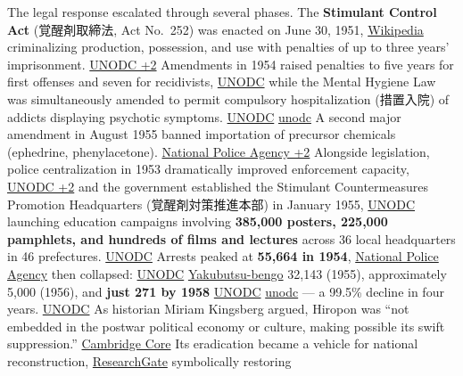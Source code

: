 The legal response escalated through several phases. The \textbf{Stimulant Control Act} (覚醒剤取締法, Act No.~252) was enacted on June 30, 1951, \href{https://ja.wikipedia.org/wiki/\%E3\%83\%A1\%E3\%82\%BF\%E3\%83\%B3\%E3\%83\%95\%E3\%82\%A7\%E3\%82\%BF\%E3\%83\%9F\%E3\%83\%B3}{Wikipedia} criminalizing production, possession, and use with penalties of up to three years' imprisonment. \href{https://www.unodc.org/unodc/en/data-and-analysis/bulletin/bulletin_1989-01-01_1_page007.html}{UNODC +2} Amendments in 1954 raised penalties to five years for first offenses and seven for recidivists, \href{https://www.unodc.org/unodc/en/data-and-analysis/bulletin/bulletin_1989-01-01_1_page007.html}{UNODC} while the Mental Hygiene Law was simultaneously amended to permit compulsory hospitalization (措置入院) of addicts displaying psychotic symptoms. \href{https://www.unodc.org/unodc/en/data-and-analysis/bulletin/bulletin_1989-01-01_1_page007.html}{UNODC} \href{https://www.unodc.org/unodc/en/data-and-analysis/bulletin/bulletin_1989-01-01_1_page007.html}{unodc} A second major amendment in August 1955 banned importation of precursor chemicals (ephedrine, phenylacetone). \href{https://www.npa.go.jp/hakusyo/s55/s550200.html}{National Police Agency +2} Alongside legislation, police centralization in 1953 dramatically improved enforcement capacity, \href{https://www.unodc.org/unodc/en/data-and-analysis/bulletin/bulletin_1989-01-01_1_page007.html}{UNODC +2} and the government established the Stimulant Countermeasures Promotion Headquarters (覚醒剤対策推進本部) in January 1955, \href{https://www.unodc.org/unodc/en/data-and-analysis/bulletin/bulletin_1957-01-01_3_page003.html}{UNODC} launching education campaigns involving \textbf{385,000 posters, 225,000 pamphlets, and hundreds of films and lectures} across 36 local headquarters in 46 prefectures. \href{https://www.unodc.org/unodc/en/data-and-analysis/bulletin/bulletin_1957-01-01_3_page003.html}{UNODC} Arrests peaked at \textbf{55,664 in 1954}, \href{https://www.npa.go.jp/hakusyo/s55/s550200.html}{National Police Agency} then collapsed: \href{https://www.unodc.org/unodc/en/data-and-analysis/bulletin/bulletin_1989-01-01_1_page007.html}{UNODC} \href{https://yakubutsu-bengo.com/statistics/}{Yakubutsu-bengo} 32,143 (1955), approximately 5,000 (1956), and \textbf{just 271 by 1958} \href{https://www.unodc.org/unodc/en/data-and-analysis/bulletin/bulletin_1989-01-01_1_page007.html}{UNODC} \href{https://www.unodc.org/unodc/en/data-and-analysis/bulletin/bulletin_1989-01-01_1_page007.html}{unodc} --- a 99.5\% decline in four years. \href{https://www.unodc.org/unodc/en/data-and-analysis/bulletin/bulletin_1989-01-01_1_page007.html}{UNODC} As historian Miriam Kingsberg argued, Hiropon was ``not embedded in the postwar political economy or culture, making possible its swift suppression.'' \href{https://www.cambridge.org/core/journals/journal-of-asian-studies/article/abs/methamphetamine-solution-drugs-and-the-reconstruction-of-nation-in-postwar-japan/0A0FCE7E74AE7D1ECE9A134114773CE6}{Cambridge Core} Its eradication became a vehicle for national reconstruction, \href{https://www.researchgate.net/publication/282513182_The_forgotten_success_story_Japan_and_the_methamphetamine_problem}{ResearchGate} symbolically restoring 